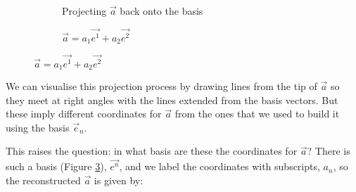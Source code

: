 \begin{figure}[h]
    \caption{Projecting a vector onto a carelessly chosen basis}
    \begin{subfigure}{0.5\textwidth}
        \centering
    \caption{Projecting $\vec{a}$ back onto the basis} \label{fig:vectors-non-orth-3}
    \end{subfigure}
    \begin{subfigure}{0.5\textwidth}
        \centering
        \caption{$\vec{a} = a_1 \vec{e^1} + a_2 \vec{e^2}$} \label{fig:vectors-non-orth-4}
    \end{subfigure}
\end{figure}

We can visualise this projection process by drawing lines from the tip of $\vec{a}$ so they meet at right angles with the lines extended from the basis vectors. But these imply different coordinates for $\vec{a}$ from the ones that we used to build it using the basis $\vec{e}_n$.

This raises the question: in what basis are these the coordinates for $\vec{a}$? There is such a basis (Figure \ref{fig:vectors-non-orth-4}), $\vec{e^n}$, and we label the coordinates with subscripts, $a_n$, so the reconstructed $\vec{a}$ is given by:

